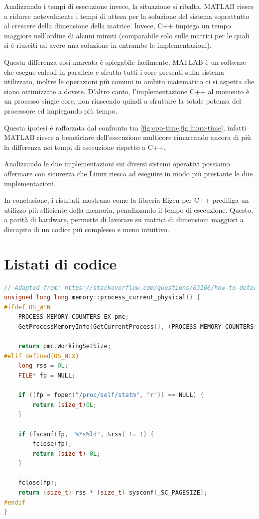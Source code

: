 \documentclass[11pt,italian]{article}
\begin{document}
\smallskip
Analizzando i tempi di esecuzione invece, la situazione si ribalta. MATLAB riesce a ridurre notevolmente i tempi di attesa per la soluzione del sistema soprattutto al crescere della dimensione della matrice.
Invece, C++ impiega un tempo maggiore nell'ordine di alcuni minuti (comparabile solo sulle matrici per le quali si è riusciti ad avere una soluzione in entrambe le implementazioni).

Questa differenza così marcata è spiegabile facilmente: MATLAB è un software che esegue calcoli in parallelo e sfrutta tutti i core presenti sulla sistema utilizzato, inoltre le operazioni più comuni in ambito matematico ci si aspetta che siano ottimizzate a dovere.
D'altro canto, l'implementazione C++ al momento è un processo single core, non riuscendo quindi a sfruttare la totale potenza del processore ed impiegando più tempo.

Questa ipotesi è rafforzata dal confronto tra \cref{fig:cpp-time,fig:linux-time}, infatti MATLAB riesce a beneficiare dell'esecuzione multicore rimarcando ancora di più la differenza nei tempi di esecuzione rispetto a C++.

\smallskip
Analizzando le due implementazioni sui diversi sistemi operativi possiamo affermare con sicurezza che Linux riesca ad eseguire in modo più prestante le due implementazioni.

\smallskip
In conclusione, i risultati mostrano come la libreria Eigen per C++ prediliga un utilizzo più efficiente della memoria, penalizzando il tempo di esecuzione. Questo, a parità di hardware, permette di lavorare su matrici di dimensioni maggiori a discapito di un codice più complesso e meno intuitivo.

\newpage
\section{Listati di codice}
\begin{lstlisting}[language=C++,basicstyle=\footnotesize\ttfamily,caption=Lettura della memoria in C++]
// Adapted from: https://stackoverflow.com/questions/63166/how-to-determine-cpu-and-memory-consumption-from-inside-a-process
unsigned long long memory::process_current_physical() {
#ifdef OS_WIN
    PROCESS_MEMORY_COUNTERS_EX pmc;
    GetProcessMemoryInfo(GetCurrentProcess(), (PROCESS_MEMORY_COUNTERS*)&pmc, sizeof(pmc));

    return pmc.WorkingSetSize;
#elif defined(OS_NIX)
    long rss = 0L;
    FILE* fp = NULL;

    if ((fp = fopen("/proc/self/statm", "r")) == NULL) {
        return (size_t)0L;
    }

    if (fscanf(fp, "%*s%ld", &rss) != 1) {
        fclose(fp);
        return (size_t) 0L;
    }

    fclose(fp);
    return (size_t) rss * (size_t) sysconf(_SC_PAGESIZE);
#endif
}
\end{lstlisting}
\end{document}
